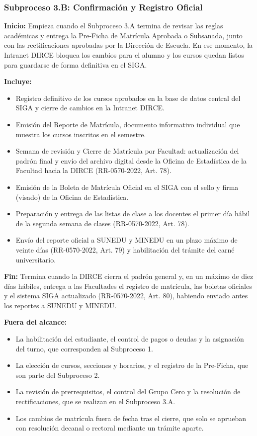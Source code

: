 \subsubsection{Subproceso 3.B: Confirmación y Registro Oficial}

\textbf{Inicio:} Empieza cuando el Subproceso 3.A termina de revisar las reglas académicas y entrega la Pre-Ficha de Matrícula Aprobada o Subsanada, junto con las rectificaciones aprobadas por la Dirección de Escuela. En ese momento, la Intranet DIRCE bloquea los cambios para el alumno y los cursos quedan listos para guardarse de forma definitiva en el SIGA.

\textbf{Incluye:}
\begin{itemize}
    \item Registro definitivo de los cursos aprobados en la base de datos central del SIGA y cierre de cambios en la Intranet DIRCE.
    \item Emisión del Reporte de Matrícula, documento informativo individual que muestra los cursos inscritos en el semestre.
    \item Semana de revisión y Cierre de Matrícula por Facultad: actualización del padrón final y envío del archivo digital desde la Oficina de Estadística de la Facultad hacia la DIRCE (RR-0570-2022, Art. 78\textdegree{}).
    \item Emisión de la Boleta de Matrícula Oficial en el SIGA con el sello y firma (visado) de la Oficina de Estadística.
    \item Preparación y entrega de las listas de clase a los docentes el primer día hábil de la segunda semana de clases (RR-0570-2022, Art. 78\textdegree{}).
    \item Envío del reporte oficial a SUNEDU y MINEDU en un plazo máximo de veinte días (RR-0570-2022, Art. 79\textdegree{}) y habilitación del trámite del carné universitario.
\end{itemize}

\textbf{Fin:} Termina cuando la DIRCE cierra el padrón general y, en un máximo de diez días hábiles, entrega a las Facultades el registro de matrícula, las boletas oficiales y el sistema SIGA actualizado (RR-0570-2022, Art. 80\textdegree{}), habiendo enviado antes los reportes a SUNEDU y MINEDU.

\textbf{Fuera del alcance:}
\begin{itemize}
    \item La habilitación del estudiante, el control de pagos o deudas y la asignación del turno, que corresponden al Subproceso 1.
    \item La elección de cursos, secciones y horarios, y el registro de la Pre-Ficha, que son parte del Subproceso 2.
    \item La revisión de prerrequisitos, el control del Grupo Cero y la resolución de rectificaciones, que se realizan en el Subproceso 3.A.
    \item Los cambios de matrícula fuera de fecha tras el cierre, que solo se aprueban con resolución decanal o rectoral mediante un trámite aparte.
\end{itemize}
